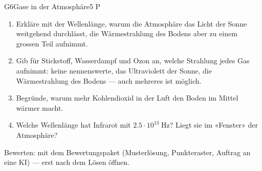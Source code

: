 \documentclass[11pt]{article}
\begin{document}
\begin{lpaufgabe}{G6}{Gase in der Atmosphäre}{5 P}
\begin{enumerate}[label=\alph*),leftmargin=*,itemsep=2pt,topsep=2pt]
\item Erkläre mit der Wellenlänge, warum die Atmosphäre das Licht der Sonne weitgehend durchlässt, die Wärmestrahlung des Bodens aber zu einem grossen Teil aufnimmt.
\item Gib für Stickstoff, Wasserdampf und Ozon an, welche Strahlung jedes Gas aufnimmt: keine nennenswerte, das Ultraviolett der Sonne, die Wärmestrahlung des Bodens — auch mehreres ist möglich.
\item Begründe, warum mehr Kohlendioxid in der Luft den Boden im Mittel wärmer macht.
\item Welche Wellenlänge hat Infrarot mit \(2.5 \cdot 10^{13}\;\text{Hz}\)? Liegt sie im «Fenster» der Atmosphäre?
\end{enumerate}
\end{lpaufgabe}

\vfill
{\small\color{lpgrau}Bewerten: mit dem Bewertungspaket (Musterlösung, Punkteraster, Auftrag an eine KI) — erst nach dem Lösen öffnen.}
\end{document}
